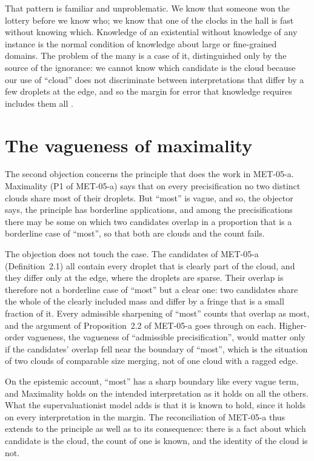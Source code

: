 \documentclass{situationist-preprint}
\begin{document}
That pattern is familiar and unproblematic. We know that someone won the lottery before we know who; we know that one of the clocks in the hall is fast without knowing which. Knowledge of an existential without knowledge of any instance is the normal condition of knowledge about large or fine-grained domains. The problem of the many is a case of it, distinguished only by the source of the ignorance: we cannot know which candidate is the cloud because our use of \enquote{cloud} does not discriminate between interpretations that differ by a few droplets at the edge, and so the margin for error that knowledge requires includes them all \citep{Williamson1994}.

\section{The vagueness of maximality}

The second objection concerns the principle that does the work in MET-05-a. Maximality (P1 of MET-05-a) says that on every precisification no two distinct clouds share most of their droplets. But \enquote{most} is vague, and so, the objector says, the principle has borderline applications, and among the precisifications there may be some on which two candidates overlap in a proportion that is a borderline case of \enquote{most}, so that both are clouds and the count fails.

The objection does not touch the case. The candidates of MET-05-a (Definition~2.1) all contain every droplet that is clearly part of the cloud, and they differ only at the edge, where the droplets are sparse. Their overlap is therefore not a borderline case of \enquote{most} but a clear one: two candidates share the whole of the clearly included mass and differ by a fringe that is a small fraction of it. Every admissible sharpening of \enquote{most} counts that overlap as most, and the argument of Proposition~2.2 of MET-05-a goes through on each. Higher-order vagueness, the vagueness of \enquote{admissible precisification}, would matter only if the candidates' overlap fell near the boundary of \enquote{most}, which is the situation of two clouds of comparable size merging, not of one cloud with a ragged edge.

On the epistemic account, \enquote{most} has a sharp boundary like every vague term, and Maximality holds on the intended interpretation as it holds on all the others. What the supervaluationist model adds is that it is known to hold, since it holds on every interpretation in the margin. The reconciliation of MET-05-a thus extends to the principle as well as to its consequence: there is a fact about which candidate is the cloud, the count of one is known, and the identity of the cloud is not.
\end{document}
